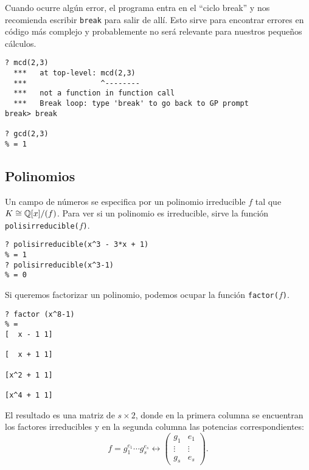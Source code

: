 Cuando ocurre algún error, el programa entra en el ``ciclo break'' y nos
recomienda escribir \texttt{break} para salir de allí. Esto sirve para encontrar
errores en código más complejo y probablemente no será relevante para nuestros
pequeños cálculos.

\begin{shaded}
\begin{verbatim}
? mcd(2,3)
  ***   at top-level: mcd(2,3)
  ***                 ^--------
  ***   not a function in function call
  ***   Break loop: type 'break' to go back to GP prompt
break> break

? gcd(2,3)
% = 1
\end{verbatim}
\end{shaded}

\pagebreak


\subsection{Polinomios}

Un campo de números se especifica por un polinomio irreducible $f$ tal que $K
\cong \mathbb{Q} [x]/(f)$. Para ver si un polinomio es irreducible, sirve la función
\texttt{polisirreducible($f$)}.

\begin{shaded}
\begin{verbatim}
? polisirreducible(x^3 - 3*x + 1)
% = 1
? polisirreducible(x^3-1)
% = 0
\end{verbatim}
\end{shaded}

Si queremos factorizar un polinomio, podemos ocupar la función
\texttt{factor($f$)}.

\begin{shaded}
\begin{verbatim}
? factor (x^8-1)
% = 
[  x - 1 1]

[  x + 1 1]

[x^2 + 1 1]

[x^4 + 1 1]
\end{verbatim}
\end{shaded}

El resultado es una matriz de $s\times 2$, donde en la primera columna se
encuentran los factores irreducibles y en la segunda columna las potencias
correspondientes:
\[ f = g_1^{e_1} \cdots g_s^{e_s} \longleftrightarrow
\begin{pmatrix}
  g_1 & e_1 \\
  \vdots & \vdots \\
  g_s & e_s
  \end{pmatrix}. \]

